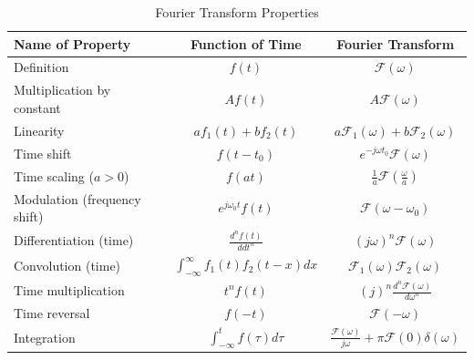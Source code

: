 \documentclass{article}
\begin{document}
\begin{table}[H]
    \centering
    \caption{Fourier Transform Properties}
    \label{tab:a3-t2}
    \begin{tabular}{l|c|c}
        Name of Property & Function of Time & Fourier Transform \\
        \hline
        \hline
        Definition & $f(t)$ & $\mathcal{F}(\omega )$ \\
        Multiplication by constant & $Af(t)$ & $A \mathcal{F}(\omega )$ \\ 
        Linearity & $af_{1}(t)+b f_2(t)$ & $a \mathcal{F}_1(\omega )+b \mathcal{F}_2(\omega )$ \\
        Time shift & $f(t-t_0)$ & $e^{-j\omega t_0}\mathcal{F}(\omega )$ \\
        Time scaling ($a>0$) & $f(at)$ & $\frac{1}{a}\mathcal{F}\left( \frac{\omega }{a} \right)$ \\
        Modulation (frequency shift) & $e^{j\omega _0t}f(t)$ & $\mathcal{F}(\omega -\omega _0)$ \\
        Differentiation (time) & $\frac{d ^nf(t)}{d dt^n}$ & $(j\omega )^n \mathcal{F}(\omega )$ \\
        Convolution (time) & $\int_{-\infty}^\infty f_{1}(t)f_2(t-x)dx$ & $\mathcal{F}_1(\omega )\mathcal{F}_2(\omega )$ \\
        Time multiplication & $t^nf(t)$ & $(j)^n \frac{d^n \mathcal{F}(\omega )}{d \omega^n}$ \\
        Time reversal & $f(-t)$ & $\mathcal{F}(-\omega )$ \\
        Integration & $\int_{-\infty}^tf(\tau )d\tau$ & $\frac{\mathcal{F}(\omega )}{j\omega }+\pi \mathcal{F}(0)\delta (\omega )$
    \end{tabular}
\end{table}
\end{document}
